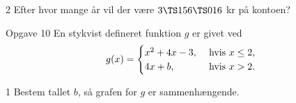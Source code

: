 \begin{delopgave}{2}
	Efter hvor mange år vil der være $3 \TS 156 \TS 016$ kr på kontoen?
\end{delopgave}
%
%
\begin{opgavetekst}{Opgave 10}
	En stykvist defineret funktion $g$ er givet ved
	\begin{align*}
		g(x) = 
		\begin{cases}
			x^2 + 4x - 3,  &\textnormal{ hvis }x \leq 2,\\
			4x + b,  &\textnormal{ hvis }x > 2.
		\end{cases}
	\end{align*}
\end{opgavetekst}
\begin{delopgave}{1}
	Bestem tallet $b$, så grafen for $g$ er sammenhængende. 
\end{delopgave}